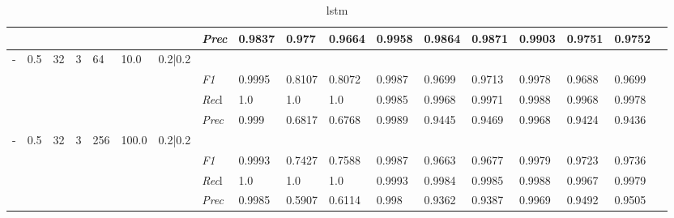 \begin{table}[]
\begin{tabularx}{\textwidth}{XXXXXXX|X|XXX|XXX|XXXX}
& & & & & & & \textit{Prec} & 0.9837 & 0.977 & 0.9664 & 0.9958 & 0.9864 & 0.9871 & 0.9903 & 0.9751 & 0.9752 \\ \midrule
- & 0.5 & 32 & 3 & 64 &10.0 & 0.2|0.2 & & & & & & & & & \\
& & & & & & & \textit{F1} & 0.9995 & 0.8107 & 0.8072 & 0.9987 & 0.9699        & 0.9713        & 0.9978        & 0.9688        & 0.9699        \\
& & & & & & & \textit{Rec}l & 1.0 & 1.0 & 1.0    & 0.9985 & 0.9968    & 0.9971    & 0.9988    & 0.9968    & 0.9978    \\
& & & & & & & \textit{Prec} & 0.999 & 0.6817 & 0.6768 & 0.9989 & 0.9445 & 0.9469 & 0.9968 & 0.9424 & 0.9436 \\ \midrule
- & 0.5 & 32 & 3 & 256 &100.0 & 0.2|0.2 & & & & & & & & & \\
& & & & & & & \textit{F1} & 0.9993 & 0.7427 & 0.7588 & 0.9987 & 0.9663        & 0.9677        & 0.9979        & 0.9723        & 0.9736        \\
& & & & & & & \textit{Rec}l & 1.0 & 1.0 & 1.0    & 0.9993 & 0.9984    & 0.9985    & 0.9988    & 0.9967    & 0.9979    \\
& & & & & & & \textit{Prec} & 0.9985 & 0.5907 & 0.6114 & 0.998 & 0.9362 & 0.9387 & 0.9969 & 0.9492 & 0.9505 \\ \midrule
\end{tabularx}
\caption{lstm}
\label{tab:all_results_lstm}
\end{table}

